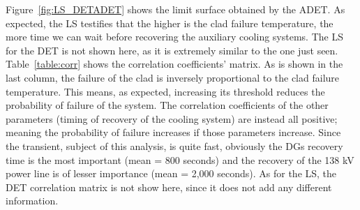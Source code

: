 Figure~\ref{fig:LS_DETADET} shows the limit surface obtained by the ADET. As expected, the LS testifies that the higher is the clad failure temperature, the more time we can wait before recovering the auxiliary cooling systems.  The LS for the DET is not shown here, as it is extremely similar to the one just seen.
Table~\ref{table:corr} shows the correlation coefficients' matrix.  As is shown in  the last column, the failure of the clad is inversely proportional to the clad failure temperature. This means, as expected, increasing its threshold reduces the probability of failure of the system. The correlation coefficients of the other parameters (timing of recovery of the cooling system) are instead all positive; meaning the probability of failure increases if those parameters increase. Since the transient, subject of this analysis, is quite fast, obviously the DGs recovery time is the most important (mean = 800 seconds) and the recovery of the 138 kV power line is of lesser importance (mean = 2,000 seconds). As for the LS, the DET correlation matrix is not show here, since it does not add any different information.

